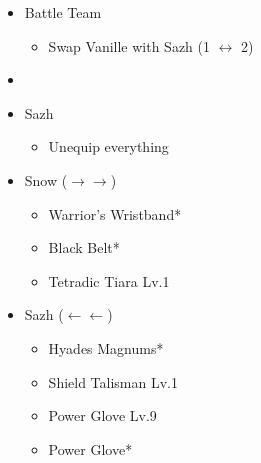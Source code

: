 \begin{menu}
	\begin{itemize}
		\paradigm
		\begin{itemize}
			\item Battle Team
				\begin{itemize}
					\item Swap Vanille with Sazh (1 $\leftrightarrow$ 2)
				\end{itemize}
			\item {}%
				{\paradigmline{\com}{\com}{\com}}%
				{\paradigmline{\com}{(\com)}{\com}}%
				{\paradigmline{(\com)}{(\sab)}{\sen}}%
				{\paradigmline[4]{\syn}{\sab}{\sen}}%
				{\paradigmline{(\com)}{(\med)}{(\sen)}}%
				{\paradigmline{\rav}{\rav}{\rav}}%
		\end{itemize}
		\equip
		\begin{itemize}
			\item Sazh
				\begin{itemize}
					\item Unequip everything
				\end{itemize}
			\item Snow ($\rightarrow\rightarrow$)
				\begin{itemize}
					\item Warrior's Wristband*
					\item Black Belt*
					\item Tetradic Tiara Lv.1
				\end{itemize}
			\item Sazh ($\leftarrow\leftarrow$)
				\begin{itemize}
					\item Hyades Magnums*
					\item Shield Talisman Lv.1
					\item Power Glove Lv.9
					\item Power Glove*
				\end{itemize}								
		\end{itemize}
	\end{itemize}
\end{menu}

\renewcommand{\first}{[1] Cerberus (\com/\com/\com)}
\renewcommand{\second}{[2] Cerberus (\com/\com/\com)}
\renewcommand{\third}{[3] Dirty Fighting (\com/\sab/\sen)}
\renewcommand{\fourth}{[4] Premeditation (\syn/\sab/\sen)}
\renewcommand{\fifth}{[5] Solidarity (\com/\med/\sen)}
\renewcommand{\sixth}{[6] Tri-Disaster (\rav/\rav/\rav)}

